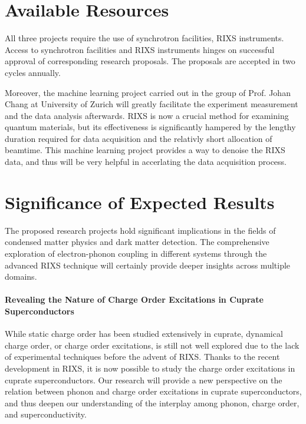 \documentclass[11pt]{article}
\begin{document}
\section{Available Resources}
All three projects require the use of synchrotron facilities, RIXS instruments. Access to synchrotron facilities and RIXS instruments hinges on successful approval of corresponding research proposals. The proposals are accepted in two cycles annually. 

Moreover, the machine learning project carried out in the group of Prof. Johan Chang at University of Zurich will greatly facilitate the experiment measurement and the data analysis afterwards. RIXS is now a crucial method for examining quantum materials, but its effectiveness is significantly hampered by the lengthy duration required for data acquisition and the relativly short allocation of beamtime. This machine learning project provides a way to denoise the RIXS data, and thus will be very helpful in accerlating the data acquisition process.  


\section{Significance of Expected Results}

The proposed research projects hold significant implications in the fields of condensed matter physics and dark matter detection. The comprehensive exploration of electron-phonon coupling in different systems through the advanced RIXS technique will certainly provide deeper insights across multiple domains.

\paragraph{Revealing the Nature of Charge Order Excitations in Cuprate Superconductors} While static charge order has been studied extensively in cuprate, dynamical charge order, or charge order excitations, is still not well explored due to the lack of experimental techniques before the advent of RIXS\cite{li_multiorbital_2020}. Thanks to the recent development in RIXS, it is now possible to study the charge order excitations in cuprate superconductors. Our research will provide a new perspective on the relation between phonon and charge order excitations in cuprate superconductors, and thus deepen our understanding of the interplay among phonon, charge order, and superconductivity. 
\end{document}
